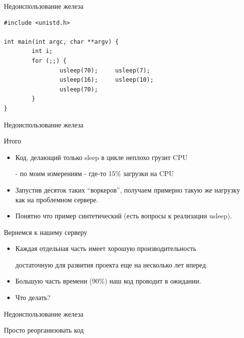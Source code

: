 \documentclass[aspectratio=169]{beamer}
\begin{document}
\begin{frame}[fragile]{Недоиспользование железа}
\begin{verbatim}
#include <unistd.h>

int main(int argc, char **argv) {
        int i;
        for (;;) {
                usleep(70);     usleep(7);
                usleep(16);     usleep(10);
                usleep(70); 
        }       
}
\end{verbatim}
\end{frame}

\begin{frame}{Недоиспользование железа}
    \begin{block}{Итого}
        \begin{itemize}
            \pause\item Код, делающий только sleep в цикле неплохо грузит CPU
                \pause\par - по моим измерениям - где-то 15\% загрузки на CPU
            \pause\item Запустив десяток таких ``воркеров'', получаем
                примерно такую же нагрузку как на проблемном сервере.
            \pause\item Понятно что пример синтетический
                (есть вопросы к реализации usleep).
        \end{itemize}
    \end{block}

    \pause
    \begin{block}{Вернемся к нашему серверу}
        \begin{itemize}
            \pause\item Каждая отдельная часть имеет хорошую производительность
                \pause\par достаточную для развития
                            проекта еще на несколько лет вперед.
            \pause\item Большую часть времени (90\%) наш код проводит
                        в ожидании.

            \pause\item Что делать?
        \end{itemize}
    \end{block}
\end{frame}

\begin{frame}{Недоиспользование железа}
    \begin{block}
        {\huge Просто реорганизовать код}
    \end{block}
\end{frame}
\end{document}
